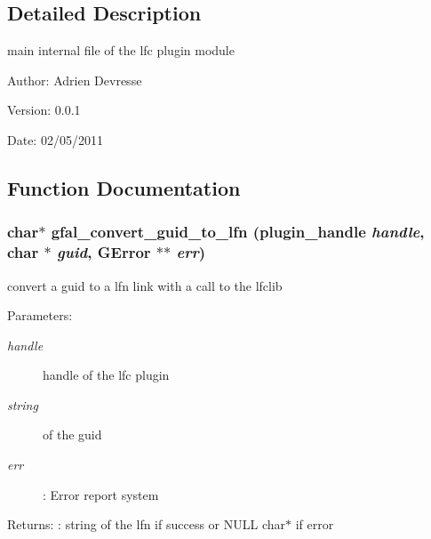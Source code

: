 \subsection{Detailed Description}
main internal file of the lfc plugin module 

\begin{Desc}
\item[Author:]Adrien Devresse \end{Desc}
\begin{Desc}
\item[Version:]0.0.1 \end{Desc}
\begin{Desc}
\item[Date:]02/05/2011 \end{Desc}


\subsection{Function Documentation}
\subsubsection{\setlength{\rightskip}{0pt plus 5cm}char$\ast$ gfal\_\-convert\_\-guid\_\-to\_\-lfn (plugin\_\-handle {\em handle}, char $\ast$ {\em guid}, GError $\ast$$\ast$ {\em err})}\label{lfc__ifce__ng_8c_4bfe1a660a34d4e1e8a5d220ee256ff5}


convert a guid to a lfn link with a call to the lfclib \begin{Desc}
\item[Parameters:]
\begin{description}
\item[{\em handle}]handle of the lfc plugin \item[{\em string}]of the guid \item[{\em err}]: Error report system \end{description}
\end{Desc}
\begin{Desc}
\item[Returns:]: string of the lfn if success or NULL char$\ast$ if error \end{Desc}
